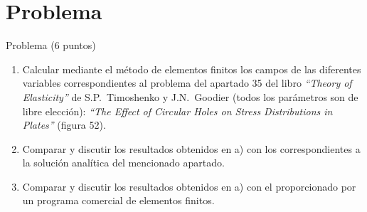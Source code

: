 \section*{Problema}

\begin{enunciado}{Problema (6 puntos)}
    \begin{enumerate}[label=\alph*), itemsep=4pt]
        \item Calcular mediante el m\'etodo de elementos finitos los campos de
        las diferentes variables correspondientes al problema del apartado 35
        del libro \textit{``Theory of Elasticity''} de S.P.~Timoshenko y
        J.N.~Goodier (todos los par\'ametros son de libre elecci\'on):
        \textit{``The Effect of Circular Holes on Stress Distributions in
        Plates''} (figura 52).
        \item Comparar y discutir los resultados obtenidos en a) con los
        correspondientes a la soluci\'on anal\'itica del mencionado apartado.
        \item Comparar y discutir los resultados obtenidos en a) con el
        proporcionado por un programa comercial de elementos finitos.
    \end{enumerate}
\end{enunciado}

